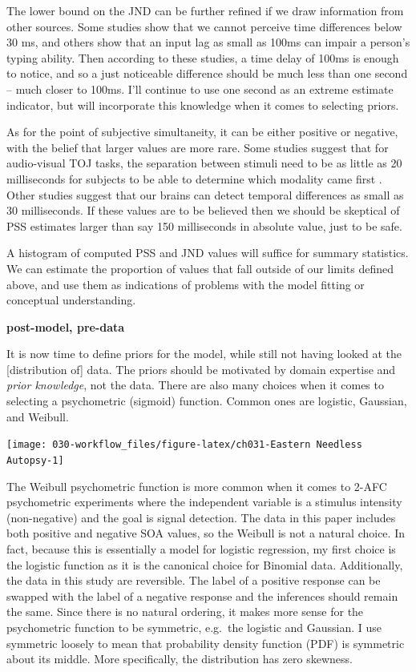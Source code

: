 \documentclass[11pt, oneside, openany]{scrbook}
\begin{document}
The lower bound on the JND can be further refined if we draw information from other sources. Some studies show that we cannot perceive time differences below 30 ms, and others show that an input lag as small as 100ms can impair a person's typing ability. Then according to these studies, a time delay of 100ms is enough to notice, and so a just noticeable difference should be much less than one second -- much closer to 100ms. I'll continue to use one second as an extreme estimate indicator, but will incorporate this knowledge when it comes to selecting priors.

As for the point of subjective simultaneity, it can be either positive or negative, with the belief that larger values are more rare. Some studies suggest that for audio-visual TOJ tasks, the separation between stimuli need to be as little as 20 milliseconds for subjects to be able to determine which modality came first \citep{vatakis2007influence}. Other studies suggest that our brains can detect temporal differences as small as 30 milliseconds. If these values are to be believed then we should be skeptical of PSS estimates larger than say 150 milliseconds in absolute value, just to be safe.

A histogram of computed PSS and JND values will suffice for summary statistics. We can estimate the proportion of values that fall outside of our limits defined above, and use them as indications of problems with the model fitting or conceptual understanding.

\textbf{post-model, pre-data}

It is now time to define priors for the model, while still not having looked at the {[}distribution of{]} data. The priors should be motivated by domain expertise and \emph{prior knowledge}, not the data. There are also many choices when it comes to selecting a psychometric (sigmoid) function. Common ones are logistic, Gaussian, and Weibull.

\begin{center}\texttt{[image: 030-workflow\_files/figure-latex/ch031-Eastern Needless Autopsy-1]} \end{center}

The Weibull psychometric function is more common when it comes to 2-AFC psychometric experiments where the independent variable is a stimulus intensity (non-negative) and the goal is signal detection. The data in this paper includes both positive and negative SOA values, so the Weibull is not a natural choice. In fact, because this is essentially a model for logistic regression, my first choice is the logistic function as it is the canonical choice for Binomial data. Additionally, the data in this study are reversible. The label of a positive response can be swapped with the label of a negative response and the inferences should remain the same. Since there is no natural ordering, it makes more sense for the psychometric function to be symmetric, e.g.~the logistic and Gaussian. I use symmetric loosely to mean that probability density function (PDF) is symmetric about its middle. More specifically, the distribution has zero skewness.
\end{document}
